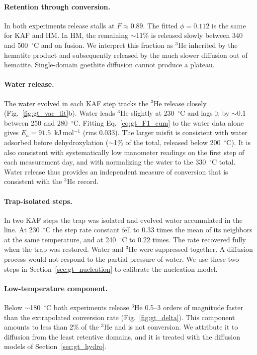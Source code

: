 \paragraph{Retention through conversion.} In both experiments release stalls at
$F\approx0.89$. The fitted $\phi=0.112$ is the same for KAF and HM. In HM, the remaining
$\sim$11\% is released slowly between 340 and 500~$^\circ$C and on fusion. We interpret this
fraction as $^3$He inherited by the hematite product and subsequently released by the much
slower diffusion out of hematite. Single-domain goethite diffusion cannot produce a plateau.

\paragraph{Water release.} The water evolved in each KAF step tracks the $^3$He release closely
(Fig.~\ref{fig:gt_vac_fit}b). Water leads $^3$He slightly at 230~$^\circ$C and lags it by
$\sim$0.1 between 250 and 280~$^\circ$C. Fitting Eq.~\ref{eq:gt_F1_cum} to the water data alone
gives $E_a = 91.5$~kJ\,mol$^{-1}$ (rms 0.033). The larger misfit is consistent with
water adsorbed before dehydroxylation ($\sim$1\% of the total, released below 200~$^\circ$C). It
is also consistent with systematically low manometer readings on the first step of each
measurement day, and with normalizing the water to the 330~$^\circ$C total. %
Water release thus provides an independent measure of conversion that is consistent with the
$^3$He record.

\paragraph{Trap-isolated steps.} In two KAF steps the trap was isolated and evolved water
accumulated in the line. At 230~$^\circ$C the step rate constant fell to $0.33$ times the mean of
its neighbors at the same temperature, and at 240~$^\circ$C to $0.22$ times. The rate recovered
fully when the trap was restored. Water and $^3$He were suppressed together. A diffusion
process would not respond to the partial pressure of water. We use these two steps in
Section~\ref{sec:gt_nucleation} to calibrate the nucleation model.

\paragraph{Low-temperature component.}
\label{sec:gt_lowT}
Below $\sim$180~$^\circ$C both experiments release $^3$He 0.5--3 orders of magnitude faster than
the extrapolated conversion rate (Fig.~\ref{fig:gt_delta}). This component amounts to less than
2\% of the $^3$He and is not conversion. We attribute it to diffusion from the least retentive
domains, and it is treated with the diffusion models of Section~\ref{sec:gt_hydro}.


